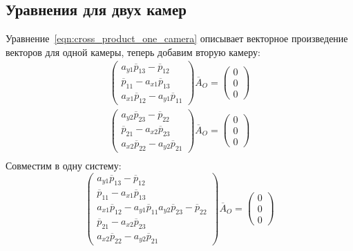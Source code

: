 \documentclass[12pt, a4paper]{article}
\begin{document}
\subsection{Уравнения для двух камер}
\label{sec:two-cameras-eq}
Уравнение~\ref{eqn:cross_product_one_camera} описывает векторное
произведение векторов для одной камеры, теперь добавим вторую камеру:
\begin{equation}
\begin{gathered}
    \begin{pmatrix}
        a_{y1} \overline{p}_{13} - \overline{p}_{12} \\
        \overline{p}_{11} - a_{x1} \overline{p}_{13} \\
        a_{x1} \overline{p}_{12} - a_{y1} \overline{p}_{11}
    \end{pmatrix} \overline{A}_O = \begin{pmatrix}
        0\\
        0\\
        0
    \end{pmatrix} \\
    \begin{pmatrix}
        a_{y2} \overline{p}_{23} - \overline{p}_{22} \\
        \overline{p}_{21} - a_{x2} \overline{p}_{23} \\
        a_{x2} \overline{p}_{22} - a_{y2} \overline{p}_{21}
    \end{pmatrix} \overline{A}_O = \begin{pmatrix}
        0\\
        0\\
        0
    \end{pmatrix} \\
\end{gathered}
\label{eqn:two_cameras_cross_separate}
\end{equation}
Совместим в одну систему:
\begin{equation}
    \begin{pmatrix}
        a_{y1} \overline{p}_{13} - \overline{p}_{12} \\
        \overline{p}_{11} - a_{x1} \overline{p}_{13} \\
        a_{x1} \overline{p}_{12} - a_{y1} \overline{p}_{11}
        a_{y2} \overline{p}_{23} - \overline{p}_{22} \\
        \overline{p}_{21} - a_{x2} \overline{p}_{23} \\
        a_{x2} \overline{p}_{22} - a_{y2} \overline{p}_{21}
    \end{pmatrix} \overline{A}_O = \begin{pmatrix}
        0\\
        0\\
        0
    \end{pmatrix}
\label{eqn:two_cameras_cross_joined}
\end{equation}
\end{document}

